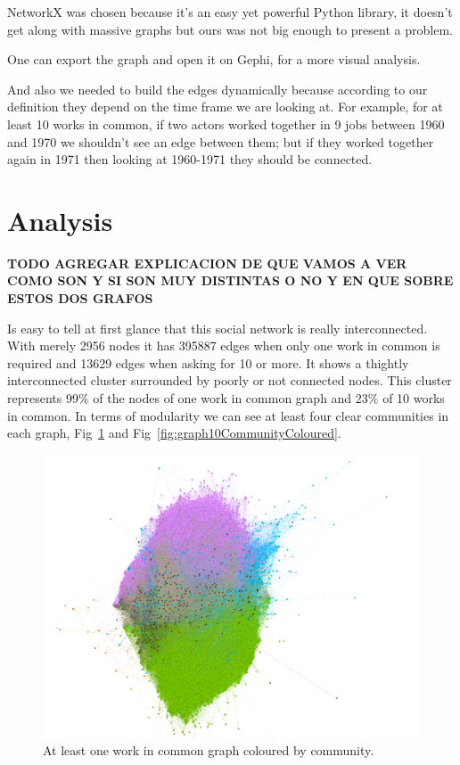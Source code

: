 NetworkX was chosen because it's an easy yet powerful Python library, it doesn't get along with massive graphs but ours was not big enough to present a problem. 

One can export the graph and open it on Gephi, for a more visual analysis.

And also we needed to build the edges dynamically because according to our definition they depend on the time frame we are looking at. For example, for at least 10 works in common, if two actors worked together in 9 jobs between 1960 and 1970 we shouldn't see an edge between them; but if they worked together again in 1971 then looking at 1960-1971 they should be connected.

\section{Analysis}
\textbf{TODO AGREGAR EXPLICACION DE QUE VAMOS A VER COMO SON Y SI SON MUY DISTINTAS O NO Y EN QUE SOBRE ESTOS DOS GRAFOS}

Is easy to tell at first glance that this social network is really interconnected. With merely 2956 nodes it has 395887 edges when only one work in common is required and 13629 edges when asking for 10 or more. It shows a thightly interconnected cluster surrounded by poorly or not connected nodes. This cluster represents 99\% of the nodes of one work in common graph and 23\% of 10 works in common. In terms of modularity we can see at least four clear communities in each graph, Fig~\ref{fig:graph1CommunityColoured} and Fig~\ref{fig:graph10CommunityColoured}.

\begin{figure}[!hbt]
	\begin{center}
	\includegraphics[width=\columnwidth]{graphics/atLeast1WorkCommunity.png}
	\caption{At least one work in common graph coloured by community.}
	\label{fig:graph1CommunityColoured}
	\end{center}
\end{figure}

